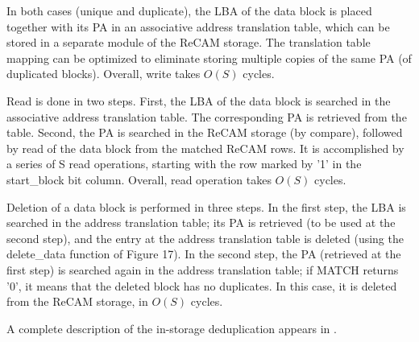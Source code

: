 \documentclass{superfri}
\begin{document}
In both cases (unique and duplicate), the LBA of the data block is placed together with its PA in an associative address translation table, which can be stored in a separate module of the ReCAM storage. The translation table mapping can be optimized to eliminate storing multiple copies of the same PA (of duplicated blocks). Overall, write takes $O(S)$ cycles.  

Read is done in two steps. First, the LBA of the data block is searched in the associative address translation table. The corresponding PA is retrieved from the table. Second, the PA is searched in the ReCAM storage (by compare), followed by read of the data block from the matched ReCAM rows. It is accomplished by a series of S read operations, starting with the row marked by '1' in the start\_block bit column. Overall, read operation takes $O(S)$ cycles.  
 
Deletion of a data block is performed in three steps. In the first step, the LBA is searched in the address translation table; its PA is retrieved (to be used at the second step), and the entry at the address translation table is deleted (using the delete\_data function of Figure 17). In the second step, the PA (retrieved at the first step) is searched again in the address translation table; if MATCH returns '0', it means that the deleted block has no duplicates. In this case, it is deleted from the ReCAM storage, in $O(S)$ cycles.

A complete description of the in-storage deduplication appears in \cite{kaplan2016deduplication}.  
\end{document}

